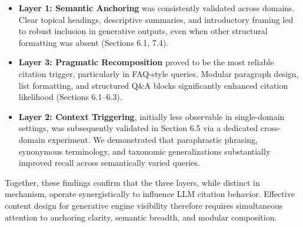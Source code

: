 \begin{itemize}
  \item \textbf{Layer 1: Semantic Anchoring} was consistently validated across domains. Clear topical headings, descriptive summaries, and introductory framing led to robust inclusion in generative outputs, even when other structural formatting was absent (Sections 6.1, 7.4).
  
  \item \textbf{Layer 3: Pragmatic Recomposition} proved to be the most reliable citation trigger, particularly in FAQ-style queries. Modular paragraph design, list formatting, and structured Q\&A blocks significantly enhanced citation likelihood (Sections 6.1–6.3).
  
  \item \textbf{Layer 2: Context Triggering}, initially less observable in single-domain settings, was subsequently validated in Section 6.5 via a dedicated cross-domain experiment. We demonstrated that paraphrastic phrasing, synonymous terminology, and taxonomic generalizations substantially improved recall across semantically varied queries.
\end{itemize}

Together, these findings confirm that the three layers, while distinct in mechanism, operate synergistically to influence LLM citation behavior. Effective content design for generative engine visibility therefore requires simultaneous attention to anchoring clarity, semantic breadth, and modular composition.

